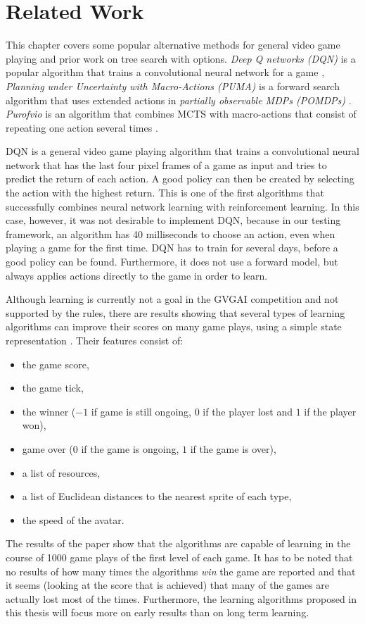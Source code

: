 \chapter{Related Work}
\label{sec:related}
This chapter covers some popular alternative methods for general video game
playing and prior work on tree search with options. \emph{Deep Q networks (DQN)}
is a popular algorithm that trains a convolutional neural network for a game
\cite{mnih2013playing}, \emph{Planning under Uncertainty with Macro-Actions
(PUMA)} is a forward search algorithm that uses extended actions in
\emph{partially observable MDPs (POMDPs)} \cite{he2010puma}.  \emph{Purofvio} is
an algorithm that combines MCTS with macro-actions that consist of repeating one
action several times \cite{powley2012monte}. 

DQN is a general video game playing algorithm that trains a convolutional neural
network that has the last four pixel frames of a game as input and tries to
predict the return of each action. A good policy can then be created by
selecting the action with the highest return. This is one of the first
algorithms that successfully combines neural network learning with reinforcement
learning. In this case, however, it was not desirable to implement DQN, because
in our testing framework, an algorithm has 40 milliseconds to choose an action,
even when playing a game for the first time. DQN has to train for several days,
before a good policy can be found.  Furthermore, it does not use a forward
model, but always applies actions directly to the game in order to learn.

Although learning is currently not a goal in the GVGAI competition and not
supported by the rules, there are results showing that several types of learning
algorithms can improve their scores on many game plays, using a simple state
representation \cite{samothrakis2015neuroevolution}. Their features consist
of: 
\begin{itemize}[noitemsep]
	\item the game score, 
	\item the game tick,
	\item the winner ($-1$ if game is still ongoing, $0$ if the player lost and
		$1$ if the player won), 
	\item game over ($0$ if the game is ongoing, $1$ if the game is over), 
	\item a list of resources, 
	\item a list of Euclidean distances to the nearest sprite of each type,
	\item the speed of the avatar. 
\end{itemize}
The results of the paper show that the algorithms are capable of learning in the
course of 1000 game plays of the first level of each game. It has to be noted
that no results of how many times the algorithms \emph{win} the game are
reported and that it seems (looking at the score that is achieved) that many of
the games are actually lost most of the times. Furthermore, the learning
algorithms proposed in this thesis will focus more on early results than on long
term learning.

